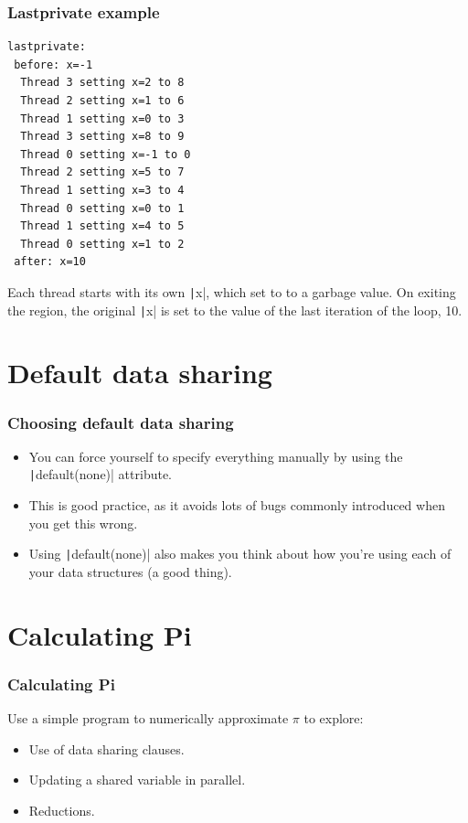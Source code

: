 \documentclass[aspectratio=169]{beamer}
\begin{document}
\begin{frame}[fragile]
\frametitle{Lastprivate example}
\begin{verbatim}
lastprivate:
 before: x=-1
  Thread 3 setting x=2 to 8
  Thread 2 setting x=1 to 6
  Thread 1 setting x=0 to 3
  Thread 3 setting x=8 to 9
  Thread 0 setting x=-1 to 0
  Thread 2 setting x=5 to 7
  Thread 1 setting x=3 to 4
  Thread 0 setting x=0 to 1
  Thread 1 setting x=4 to 5
  Thread 0 setting x=1 to 2
 after: x=10
\end{verbatim}
Each thread starts with its own \texttt|x|, which set to to a garbage value.
On exiting the region, the original \texttt|x| is set to the value of the last iteration of the loop, 10.
\end{frame}

\section{Default data sharing}
\begin{frame}
\frametitle{Choosing default data sharing}

\begin{itemize}
  \item You can force yourself to specify everything manually by using the \texttt|default(none)| attribute.
  \item This is good practice, as it avoids lots of bugs commonly introduced when you get this wrong. 
  \item Using \texttt|default(none)| also makes you think about how you're using each of your data structures (a good thing).
\end{itemize}

\end{frame}

\section{Calculating Pi}
\begin{frame}
\frametitle{Calculating Pi}
Use a simple program to numerically approximate $\pi$ to explore:
\begin{itemize}
  \item Use of data sharing clauses.
  \item Updating a shared variable in parallel.
  \item Reductions.
\end{itemize}
\end{frame}
\end{document}
